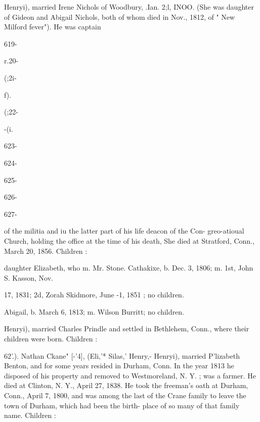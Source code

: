 \documentclass{book}
\begin{document}
Henryi), married Irene Nichols of Woodbury, .Ian. 2;l, INOO. 
(She was daughter of Gideon and Abigail Nichols, both of whom 
died in Nov., 1812, of " New Milford fever"). He was captain 



619- 




r.20- 




(;2i- 


 f). 


(;22- 


-(i. 


623- 




624- 




625- 




626- 




627- 






of the militia and iu the latter part of his life deacon of the Con- 
greo-atioual Church, holding the office at the time of his death, 
She died at Stratford, Conn., March 20, 1856. Children : 

daughter Elizabeth, who m. Mr. Stone. 
Cathakixe, b. Dec. 3, 1806; m. 1st, John S. Kasson, Nov. 

17, 1831; 2d, Zorah Skidmore, June -1, 1851 ; no children. 

Abigail, b. March 6, 1813; m. Wilson Burritt; no children. 

Henryi), married Charles Prindle and settled in Bethlehem, 
Conn., where their children were born. Children : 












62'.). Nathan Ckane" [-'4], (Eli,'* Silas,' Henry,- Henryi), 
married P'lizabeth Benton, and for some years resided in Durham, 
Conn. In the year 1813 he disposed of his property and removed 
to Westmoreland, N. Y. ; was a farmer. He died at Clinton, 
N. Y., April 27, 1838. He took the freeman's oath at Durham, 
Conn., April 7, 1800, and was among the last of the Crane 
family to leave the town of Durham, which had been the birth- 
place of so many of that family name. Children : 
\end{document}
